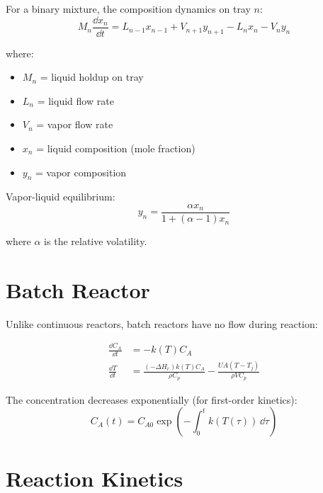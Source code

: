 For a binary mixture, the composition dynamics on tray $n$:
\begin{equation}
M_n\frac{\dd x_n}{\dd t} = L_{n-1}x_{n-1} + V_{n+1}y_{n+1} - L_n x_n - V_n y_n
\end{equation}

where:
\begin{itemize}
    \item $M_n$ = liquid holdup on tray
    \item $L_n$ = liquid flow rate
    \item $V_n$ = vapor flow rate
    \item $x_n$ = liquid composition (mole fraction)
    \item $y_n$ = vapor composition
\end{itemize}

Vapor-liquid equilibrium:
\begin{equation}
y_n = \frac{\alpha x_n}{1 + (\alpha - 1)x_n}
\end{equation}

where $\alpha$ is the relative volatility.

\section{Batch Reactor}
\label{sec:batch}

Unlike continuous reactors, batch reactors have no flow during reaction:

\begin{align}
\frac{\dd C_A}{\dd t} &= -k(T)C_A \\
\frac{\dd T}{\dd t} &= \frac{(-\Delta H_r)k(T)C_A}{\rho C_p} - \frac{UA(T - T_j)}{\rho V C_p}
\end{align}

The concentration decreases exponentially (for first-order kinetics):
\begin{equation}
C_A(t) = C_{A0}\exp\left(-\int_0^t k(T(\tau))\,\dd\tau\right)
\end{equation}

\section{Reaction Kinetics}
\label{sec:kinetics}

